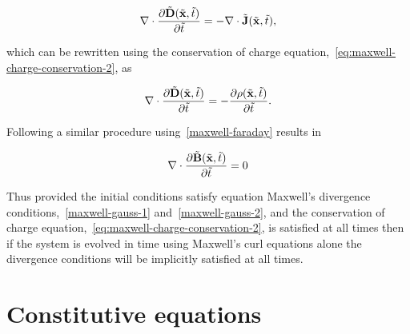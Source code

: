 $$
\nabla \cdot \frac{\partial \tilde{\mathbf{D}}(\tilde{\mathbf{x}}, \tilde{t})}{\partial \tilde{t}} = - \nabla \cdot \tilde{\mathbf{J}}(\tilde{\mathbf{x}},\tilde{t}),
$$

which can be rewritten using the conservation of charge equation,~\eqref{eq:maxwell-charge-conservation-2}, as

$$
\nabla \cdot \frac{\partial\tilde{\mathbf{D}}(\tilde{\mathbf{x}}, \tilde{t})}{\partial \tilde{t}} = - \frac{\partial \rho (\tilde{\mathbf{x}},\tilde{t})}{\partial \tilde{t}}.
$$

Following a similar procedure using~\eqref{maxwell-faraday} results in

$$
\nabla \cdot \frac{\partial \tilde{\mathbf{B}}(\tilde{\mathbf{x}}, \tilde{t})}{\partial \tilde{t}} = 0
$$

Thus provided the initial conditions satisfy equation Maxwell's divergence conditions,~\eqref{maxwell-gauss-1} and~\eqref{maxwell-gauss-2}, and the conservation of charge equation,~\eqref{eq:maxwell-charge-conservation-2}, is satisfied at all times then if the system is evolved in time using Maxwell's curl equations alone the divergence conditions will be implicitly satisfied at all times.

\section{Constitutive equations}

